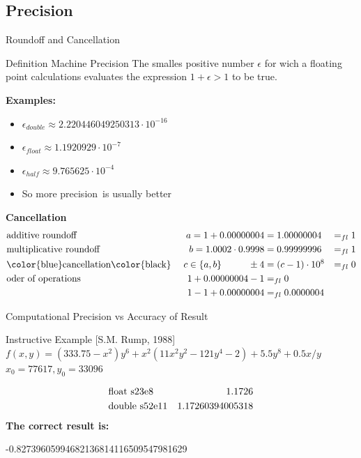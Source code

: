\documentclass[10pt]{beamer}
\begin{document}
\subsection{Precision}
\begin{frame}{Roundoff and Cancellation}
\begin{block}{Definition Machine Precision}
The smalles positive number $\epsilon$ for wich a floating point 
calculations evaluates the expression $1 + \epsilon > 1$ to be true.
\end{block}
\textbf{Examples:}
\begin{itemize}
\item $\epsilon_{double} \approx 2.220446049250313\cdot 10^{-16}$
\item $\epsilon_{float} \approx 1.1920929\cdot 10^{-7}$
\item $\epsilon_{half} \approx 9.765625\cdot 10^{-4}$
\item So \color{red}more precision\color{black}~is usually \color{red}better
\end{itemize}
\textbf{Cancellation}
\begin{align*}
&\text{additive roundoff } & a=1+0.00000004 &= 1.00000004 &=_{fl} 1\\
&\text{multiplicative roundoff } & b = 1.0002 \cdot 0.9998 &=0.99999996 &=_{fl} 1\\
&\text{\color{blue}cancellation\color{black}~}  &c\in \lbrace a,b\rbrace 
\hspace{1cm}\pm 4 &= (c-1)\cdot 10^8 &=_{fl} 0 \\
&\text{oder~of~operations}  & 1+0.00000004 -1 &=_{fl} 0\\
& &1-1 + 0.00000004 &=_{fl} 0.0000004
\end{align*}
\end{frame}


\begin{frame}{Computational Precision vs Accuracy of Result}
\begin{block}{Instructive Example [S.M. Rump, 1988]}
$f(x,y) = (333.75 - x^2)y^6 + x^2(11x^2y^2 - 121y^4-2) + 5.5y^8 + 0.5x/y$\\
$x_0 = 77617, y_0 = 33096$
\end{block}

\begin{align*}
&\text{float s23e8} \hfill &1.1726\\
&\text{double s52e11} \hfill &1.17260394005318\\
\end{align*}
\textbf{The correct result is:}\\
\begin{center}
\color{red}-0.82739605994682136814116509547981629\color{black}
\end{center}
\end{frame}
\end{document}
